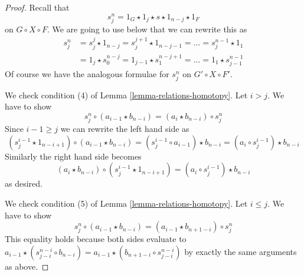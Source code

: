 \documentclass{stacks-project}
\theoremstyle{plain}
\theoremstyle{definition}
\theoremstyle{remark}
\numberwithin{equation}{subsection}
\begin{document}
\begin{proof}
\medskip\noindent
Recall that
$$
s^n_j = 1_G \star 1_j \star s \star 1_{n - j} \star 1_F
$$
on $G \circ X \circ F$. We are going to use below
that we can rewrite this as
\begin{align*}
s^n_j
& =
s^j_j \star 1_{n - j} = s^{j + 1}_j \star 1_{n - j - 1} = \ldots =
s^{n - 1}_j \star 1_1 \\
& =
1_j \star s^{n - j}_0 = 1_{j - 1} \star s^{n - j + 1}_1 = \ldots =
1_1 \star s^{n - 1}_{j - 1}
\end{align*}
Of course we have the analogous formulae for $s^n_j$ on $G' \circ X \circ F'$.

\medskip\noindent
We check condition (4) of Lemma \ref{lemma-relations-homotopy}.
Let $i > j$. We have to show
$$
s^n_j \circ (a_{i - 1} \star b_{n - i}) =
(a_i \star b_{n - i}) \circ s^n_j
$$
Since $i - 1 \geq j$ we can rewrite the left hand side as
$$
(s^{i - 1}_j \star 1_{n - i + 1}) \circ (a_{i - 1} \star b_{n - i}) =
(s^{i - 1}_j \circ a_{i - 1}) \star b_{n - i} =
(a_i \circ s^{i - 1}_j) \star b_{n - i}
$$
Similarly the right hand side becomes
$$
(a_i \star b_{n - i}) \circ (s^{i - 1}_j \star 1_{n - i + 1}) =
(a_i \circ s^{i - 1}_j) \star b_{n - i}
$$
as desired.

\medskip\noindent
We check condition (5) of Lemma \ref{lemma-relations-homotopy}.
Let $i \leq j$. We have to show
$$
s^n_j \circ (a_{i - 1} \star b_{n - i}) =
(a_{i - 1} \star b_{n + 1 - i}) \circ s^n_j
$$
This equality holds because both sides evaluate to
$a_{i - 1} \star (s^{n - i}_{j - i} \circ b_{n - i}) =
a_{i - 1} \star (b_{n + 1 - i} \circ s^{n - i}_{j - i})$
by exactly the same arguments as above.
\end{proof}
\end{document}
